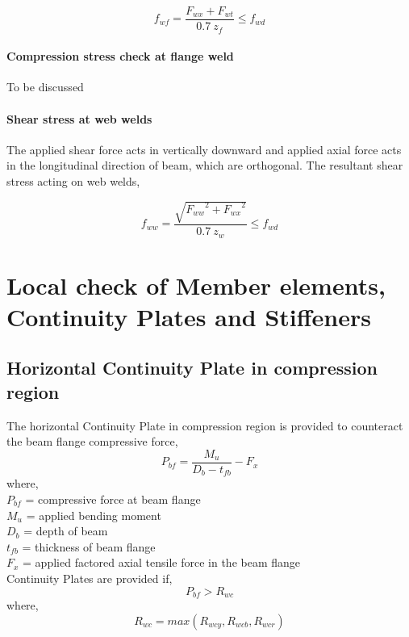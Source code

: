 \documentclass[11.5pt,a4paper,oneside]{report}
\begin{document}
\begin{Form}
\begin{equation}
	f_{wf} = \frac{F_{wx} + F_{wt}}{0.7~z_f} \leq f_{wd}
\end{equation}

\subsubsection{Compression stress check at flange weld}
To be discussed

\subsubsection{Shear stress at web welds}
The applied shear force acts in vertically downward and 
applied axial force acts in the longitudinal direction of beam,
which are orthogonal. 
The resultant shear stress acting on web welds,

\begin{equation}
	f_{ww} = \frac{\sqrt{{F_{ww}}^2 + {F_{wx}}^2}}{0.7~z_w} \leq f_{wd}
\end{equation}

\chapter{Local check of Member elements, Continuity Plates and Stiffeners}
\section{Horizontal Continuity Plate in compression region}
The horizontal Continuity Plate in compression region is provided to counteract the beam flange compressive force, 
\begin{equation}
P_{bf} = \frac{M_u}{D_b - t_{fb}} - F_x
\end{equation}
where,\\
\indent $P_{bf}$ = compressive force at beam flange \\ 
\indent ${M_u}$ = applied bending moment \\ 
\indent $D_b$ = depth of beam \\
\indent $t_{fb}$ = thickness of beam flange \\
\indent $F_x$ = applied factored axial tensile force in the beam flange\\

\noindent
Continuity Plates are provided if,
\begin{equation}
P_{bf} >  R_{wc}
\end{equation}
\noindent
where,
\begin{equation}
R_{wc} = max(R_{wcy}, R_{wcb}, R_{wcr})
\end{equation}


\end{Form}
\end{document}
